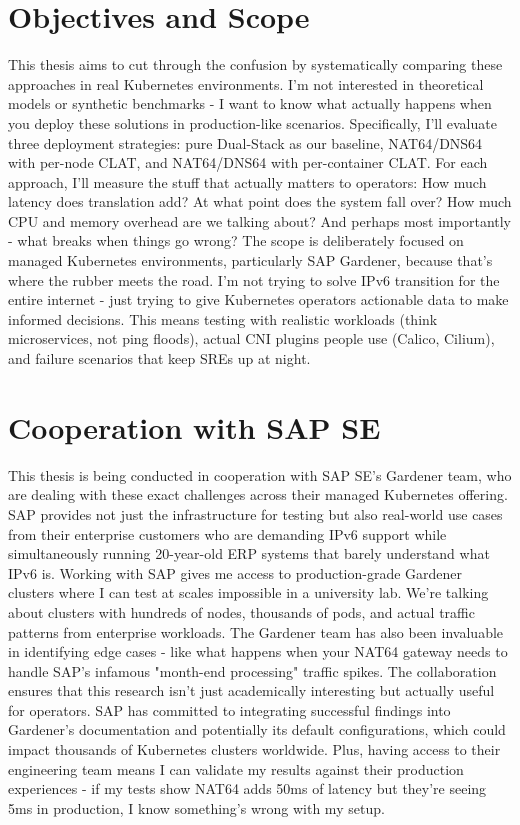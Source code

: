 \section{Objectives and Scope}
This thesis aims to cut through the confusion by systematically comparing these approaches in real Kubernetes environments. I'm not interested in theoretical models or synthetic benchmarks - I want to know what actually happens when you deploy these solutions in production-like scenarios.
Specifically, I'll evaluate three deployment strategies: pure Dual-Stack as our baseline, NAT64/DNS64 with per-node CLAT, and NAT64/DNS64 with per-container CLAT. For each approach, I'll measure the stuff that actually matters to operators: How much latency does translation add? At what point does the system fall over? How much CPU and memory overhead are we talking about? And perhaps most importantly - what breaks when things go wrong?
The scope is deliberately focused on managed Kubernetes environments, particularly SAP Gardener, because that's where the rubber meets the road. I'm not trying to solve IPv6 transition for the entire internet - just trying to give Kubernetes operators actionable data to make informed decisions. This means testing with realistic workloads (think microservices, not ping floods), actual CNI plugins people use (Calico, Cilium), and failure scenarios that keep SREs up at night.

\section{Cooperation with SAP SE}
This thesis is being conducted in cooperation with SAP SE's Gardener team, who are dealing with these exact challenges across their managed Kubernetes offering. SAP provides not just the infrastructure for testing but also real-world use cases from their enterprise customers who are demanding IPv6 support while simultaneously running 20-year-old ERP systems that barely understand what IPv6 is.
Working with SAP gives me access to production-grade Gardener clusters where I can test at scales impossible in a university lab. We're talking about clusters with hundreds of nodes, thousands of pods, and actual traffic patterns from enterprise workloads. The Gardener team has also been invaluable in identifying edge cases - like what happens when your NAT64 gateway needs to handle SAP's infamous "month-end processing" traffic spikes.
The collaboration ensures that this research isn't just academically interesting but actually useful for operators. SAP has committed to integrating successful findings into Gardener's documentation and potentially its default configurations, which could impact thousands of Kubernetes clusters worldwide. Plus, having access to their engineering team means I can validate my results against their production experiences - if my tests show NAT64 adds 50ms of latency but they're seeing 5ms in production, I know something's wrong with my setup.
